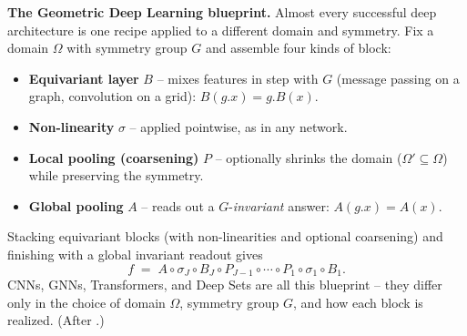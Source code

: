 \begin{svgraybox}
\textbf{The Geometric Deep Learning blueprint.}
Almost every successful deep architecture is one recipe applied to a different
domain and symmetry. Fix a domain $\Omega$ with symmetry group $G$ and assemble
four kinds of block:
\begin{itemize}
  \item \textbf{Equivariant layer} $B$ -- mixes features in step with $G$
        (message passing on a graph, convolution on a grid):
        $B(g.x)=g.B(x)$.
  \item \textbf{Non-linearity} $\sigma$ -- applied pointwise, as in any network.
  \item \textbf{Local pooling (coarsening)} $P$ -- optionally shrinks the domain
        ($\Omega'\subseteq\Omega$) while preserving the symmetry.
  \item \textbf{Global pooling} $A$ -- reads out a $G$-\emph{invariant} answer:
        $A(g.x)=A(x)$.
\end{itemize}
Stacking equivariant blocks (with non-linearities and optional coarsening) and
finishing with a global invariant readout gives
\[
  f \;=\; A \circ \sigma_J \circ B_J \circ P_{J-1}\circ\cdots\circ
          P_1 \circ \sigma_1 \circ B_1 .
\]
CNNs, GNNs, Transformers, and Deep Sets are all this blueprint -- they differ
only in the choice of domain $\Omega$, symmetry group $G$, and how each block is
realized. (After \citealp{Bronstein2021_geometricDL_book}.)
\end{svgraybox}


